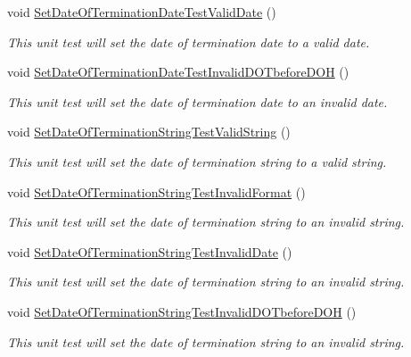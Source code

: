 \begin{DoxyCompactItemize}
void \hyperlink{class_my_all_employee_1_1_tests_1_1_full_time_employee_tests_a763d6c3bcda0733dc7d575f934f941fb}{Set\+Date\+Of\+Termination\+Date\+Test\+Valid\+Date} ()
\begin{DoxyCompactList}\small\item\em This unit test will set the date of termination date to a valid date. \end{DoxyCompactList}\item 
void \hyperlink{class_my_all_employee_1_1_tests_1_1_full_time_employee_tests_afa99fad6c7ea636ea1f96c503287ff02}{Set\+Date\+Of\+Termination\+Date\+Test\+Invalid\+D\+O\+Tbefore\+D\+O\+H} ()
\begin{DoxyCompactList}\small\item\em This unit test will set the date of termination date to an invalid date. \end{DoxyCompactList}\item 
void \hyperlink{class_my_all_employee_1_1_tests_1_1_full_time_employee_tests_a135facda50190867f185bcbe56ede170}{Set\+Date\+Of\+Termination\+String\+Test\+Valid\+String} ()
\begin{DoxyCompactList}\small\item\em This unit test will set the date of termination string to a valid string. \end{DoxyCompactList}\item 
void \hyperlink{class_my_all_employee_1_1_tests_1_1_full_time_employee_tests_a02a552372a201802b43efac23c4ed572}{Set\+Date\+Of\+Termination\+String\+Test\+Invalid\+Format} ()
\begin{DoxyCompactList}\small\item\em This unit test will set the date of termination string to an invalid string. \end{DoxyCompactList}\item 
void \hyperlink{class_my_all_employee_1_1_tests_1_1_full_time_employee_tests_ac1449482cd1dd5b710745c1c3f141278}{Set\+Date\+Of\+Termination\+String\+Test\+Invalid\+Date} ()
\begin{DoxyCompactList}\small\item\em This unit test will set the date of termination string to an invalid string. \end{DoxyCompactList}\item 
void \hyperlink{class_my_all_employee_1_1_tests_1_1_full_time_employee_tests_a758faf35850fd29f4a13640965848b6b}{Set\+Date\+Of\+Termination\+String\+Test\+Invalid\+D\+O\+Tbefore\+D\+O\+H} ()
\begin{DoxyCompactList}\small\item\em This unit test will set the date of termination string to an invalid string. \end{DoxyCompactList}\item 

\end{DoxyCompactItemize}

